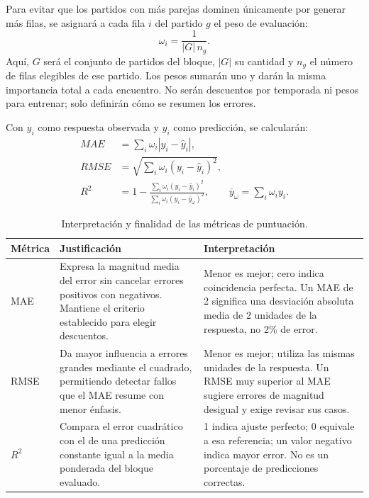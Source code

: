 Para evitar que los partidos con más parejas dominen únicamente por generar más filas, se asignará a cada fila $i$ del partido $g$ el peso de evaluación:
\[
 \omega_i=\frac{1}{|G|\,n_g}.
\]
Aquí, $G$ será el conjunto de partidos del bloque, $|G|$ su cantidad y $n_g$ el número de filas elegibles de ese partido. Los pesos sumarán uno y darán la misma importancia total a cada encuentro. No serán descuentos por temporada ni pesos para entrenar; solo definirán cómo se resumen los errores.

Con $y_i$ como respuesta observada y $\widehat y_i$ como predicción, se calcularán:
\begin{align}
 MAE &= \sum_i\omega_i|y_i-\widehat y_i|,\\
 RMSE &= \sqrt{\sum_i\omega_i(y_i-\widehat y_i)^2},\\
 R^2 &=1-\frac{\sum_i\omega_i(y_i-\widehat y_i)^2}
 {\sum_i\omega_i(y_i-\overline y_\omega)^2},
 \qquad \overline y_\omega=\sum_i\omega_i y_i.
\end{align}

\begin{table}[htbp]
\centering
\small
\caption{Interpretación y finalidad de las métricas de puntuación.}
\label{tab:metricas-modelo-6161}
\begin{tabularx}{\textwidth}{@{}p{1.6cm}XX@{}}
\toprule
\textbf{Métrica} & \textbf{Justificación} & \textbf{Interpretación}\\
\midrule
MAE & Expresa la magnitud media del error sin cancelar errores positivos con negativos. Mantiene el criterio establecido para elegir descuentos. & Menor es mejor; cero indica coincidencia perfecta. Un MAE de 2 significa una desviación absoluta media de 2 unidades de la respuesta, no 2\% de error.\\
RMSE & Da mayor influencia a errores grandes mediante el cuadrado, permitiendo detectar fallos que el MAE resume con menor énfasis. & Menor es mejor; utiliza las mismas unidades de la respuesta. Un RMSE muy superior al MAE sugiere errores de magnitud desigual y exige revisar sus casos.\\
$R^2$ & Compara el error cuadrático con el de una predicción constante igual a la media ponderada del bloque evaluado. & 1 indica ajuste perfecto; 0 equivale a esa referencia; un valor negativo indica mayor error. No es un porcentaje de predicciones correctas.\\
\bottomrule
\end{tabularx}
\end{table}

